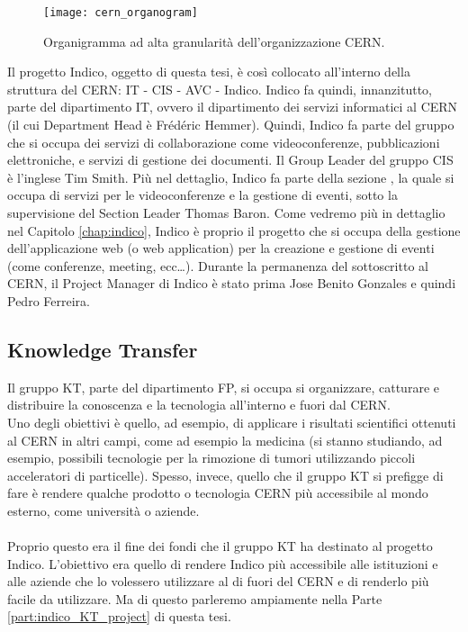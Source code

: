 			\begin{figure}[h!]
				\begin{center}
					\texttt{[image: cern\_organogram]}
				\end{center}
				\caption[Organigramma del CERN]{Organigramma ad alta granularità dell'organizzazione CERN.}
				\label{fig:cern_organogram}
			\end{figure}
			\noindent
			Il progetto Indico, oggetto di questa tesi, è così collocato all'interno della struttura del \ac{CERN}: \ac{IT} - \acs{CIS} - \acs{AVC} - Indico. Indico fa quindi, innanzitutto, parte del dipartimento \ac{IT}, ovvero il dipartimento dei servizi informatici al \ac{CERN} (il cui Department Head è Frédéric Hemmer). Quindi, Indico fa parte del gruppo  che si occupa dei servizi di collaborazione come videoconferenze, pubblicazioni elettroniche, e servizi di gestione dei documenti. Il Group Leader del gruppo \ac{CIS} è l'inglese Tim Smith. Più nel dettaglio, Indico fa parte della sezione , la quale si occupa di servizi per le videoconferenze e la gestione di eventi, sotto la supervisione del Section Leader Thomas Baron. Come vedremo più in dettaglio nel Capitolo \ref{chap:indico}, Indico è proprio il progetto che si occupa della gestione dell'applicazione web (o web application) per la creazione e gestione di eventi (come conferenze, meeting, ecc\dots). Durante la permanenza del sottoscritto al \ac{CERN}, il Project Manager di Indico è stato prima Jose Benito Gonzales e quindi Pedro Ferreira.
		
		\subsection{Knowledge Transfer} \label{subsec:CERN;lavoro;KT}
		
			Il gruppo \ac{KT}, parte del dipartimento \ac{FP}, si occupa si organizzare, catturare e distribuire la conoscenza e la tecnologia all'interno e fuori dal \ac{CERN}.\\
			Uno degli obiettivi è quello, ad esempio, di applicare i risultati scientifici ottenuti al \ac{CERN} in altri campi, come ad esempio la medicina (si stanno studiando, ad esempio, possibili tecnologie per la rimozione di tumori utilizzando piccoli acceleratori di particelle). Spesso, invece, quello che il gruppo \ac{KT} si prefigge di fare è rendere qualche prodotto o tecnologia \ac{CERN} più accessibile al mondo esterno, come università o aziende.\\
			\\
			Proprio questo era il fine dei fondi che il gruppo \ac{KT} ha destinato al progetto Indico. L'obiettivo era quello di rendere Indico più accessibile alle istituzioni e alle aziende che lo volessero utilizzare al di fuori del \ac{CERN} e di renderlo più facile da utilizzare. Ma di questo parleremo ampiamente nella Parte \ref{part:indico_KT_project} di questa tesi.
